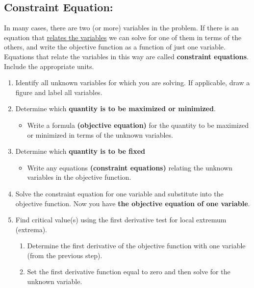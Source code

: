 \subsection*{Constraint Equation:}
In many cases, there are two (or more) variables in the problem. If there is an equation that \underline{relates the variables} we can solve for one of them in terms of the others, and write the objective function as a function of just one variable. Equations that relate the variables in this way are called \textbf{constraint equations}. Include the appropriate units.
\vspace{0.5 cm}

\begin{tcolorbox}[title={Solving \textbf{Constrained} Optimization Problems: Problem-Solving Strategy}]
\begin{enumerate}[leftmargin=*]
\item Identify all unknown variables for which you are solving.  If applicable, draw a figure and label all variables.
\item Determine which \textbf{quantity is to be maximized or minimized}.
    \begin{itemize}
        \item Write a formula \textbf{(objective equation)} for the quantity to be maximized or minimized in terms of the unknown variables. 
    \end{itemize}
\item Determine which \textbf{quantity is to be fixed}
    \begin{itemize}
        \item Write any equations \textbf{(constraint equations)} relating the unknown variables in the objective function.  
    \end{itemize}
\item Solve the constraint equation for one variable and substitute into the objective function. Now you have \textbf{the objective equation of one variable}.
\item Find critical value(s) using the first derivative test for local extremum (extrema).
    \renewcommand{\labelenumii}{(\roman{enumii})}
    \begin{enumerate}
        \item Determine the first derivative of the objective function with one variable (from the previous step). 
        \item Set the first derivative function equal to zero and then solve for the unknown variable.

\end{enumerate}
\end{enumerate}
\end{tcolorbox}
